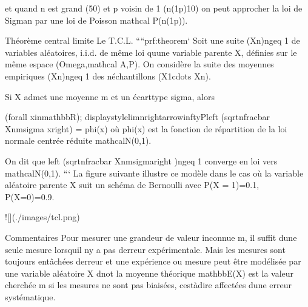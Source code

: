 \documentclass[letterpaper,10pt,french]{sphinxmanual}
\begin{document}
\begin{sphinxVerbatim}[commandchars=\\\{\}]
et quand \PYGZdl{}n\PYGZdl{} est grand (\PYGZgt{}50) et \PYGZdl{}p\PYGZdl{} voisin de 1 (\PYGZdl{}n(1\PYGZhy{}p)\PYGZlt{}10\PYGZdl{}) on peut approcher la loi de \PYGZdl{}\PYGZbs{}Sigma\PYGZus{}n\PYGZdl{} par une loi de Poisson \PYGZdl{}\PYGZbs{}mathcal P(n(1\PYGZhy{}p))\PYGZdl{}.


\PYGZsh{}\PYGZsh{} Théorème central limite
\PYGZsh{}\PYGZsh{}\PYGZsh{} Le T.C.L.
````\PYGZob{}prf:theorem\PYGZcb{}`
Soit une suite \PYGZdl{}(X\PYGZus{}n)\PYGZus{}\PYGZob{}n\PYGZbs{}geq 1\PYGZcb{}\PYGZdl{} de variables aléatoires, i.i.d. de même loi qu\PYGZsq{}une variable parente \PYGZdl{}X\PYGZdl{}, définies sur le même espace \PYGZdl{}(\PYGZbs{}Omega,\PYGZbs{}mathcal A,P)\PYGZdl{}. On considère la suite des moyennes empiriques \PYGZdl{}(X\PYGZus{}n)\PYGZus{}\PYGZob{}n\PYGZbs{}geq 1\PYGZcb{}\PYGZdl{} des \PYGZdl{}n\PYGZdl{}\PYGZhy{}échantillons \PYGZdl{}(X\PYGZus{}1\PYGZbs{}cdots X\PYGZus{}n)\PYGZdl{}.

Si \PYGZdl{}X\PYGZdl{} admet une moyenne \PYGZdl{}m\PYGZdl{} et un écart\PYGZhy{}type \PYGZdl{}\PYGZbs{}sigma\PYGZdl{}, alors 

\PYGZdl{}(\PYGZbs{}forall x\PYGZbs{}in\PYGZbs{}mathbb\PYGZob{}R\PYGZcb{})\PYGZbs{}; \PYGZbs{}displaystyle\PYGZbs{}lim\PYGZus{}\PYGZob{}n\PYGZbs{}rightarrow\PYGZbs{}infty\PYGZcb{}P\PYGZbs{}left (\PYGZbs{}sqrt\PYGZob{}n\PYGZcb{}\PYGZbs{}frac\PYGZob{}\PYGZbs{}bar X\PYGZus{}n\PYGZhy{}m\PYGZcb{}\PYGZob{}\PYGZbs{}sigma\PYGZcb{} \PYGZlt{}x\PYGZbs{}right) = \PYGZbs{}phi(x)\PYGZdl{}
où \PYGZdl{} \PYGZbs{}phi(x)\PYGZdl{} est la fonction de répartition de la loi normale centrée réduite \PYGZdl{}\PYGZbs{}mathcal\PYGZob{}N\PYGZcb{}(0,1)\PYGZdl{}.

On dit que \PYGZdl{}\PYGZbs{}left (\PYGZbs{}sqrt\PYGZob{}n\PYGZcb{}\PYGZbs{}frac\PYGZob{}\PYGZbs{}bar X\PYGZus{}n\PYGZhy{}m\PYGZcb{}\PYGZob{}\PYGZbs{}sigma\PYGZcb{}\PYGZbs{}right )\PYGZus{}\PYGZob{}n\PYGZbs{}geq 1\PYGZcb{}\PYGZdl{} converge en loi vers \PYGZdl{}\PYGZbs{}mathcal\PYGZob{}N\PYGZcb{}(0,1)\PYGZdl{}.
```
La figure suivante illustre ce modèle dans le cas où la variable aléatoire parente \PYGZdl{}X\PYGZdl{} suit un schéma de Bernoulli avec \PYGZdl{}P(X = 1)=0.1, P(X=0)=0.9\PYGZdl{}.

![](./images/tcl.png)


\PYGZsh{}\PYGZsh{}\PYGZsh{} Commentaires
Pour mesurer une grandeur de valeur inconnue \PYGZdl{}m\PYGZdl{}, il suffit d\PYGZsq{}une seule mesure lorsqu\PYGZsq{}il n\PYGZsq{}y a pas d\PYGZsq{}erreur expérimentale. Mais les mesures sont toujours entâchées d\PYGZsq{}erreur et une expérience ou mesure peut être modélisée par une variable aléatoire \PYGZdl{}X\PYGZdl{} dnot la moyenne théorique \PYGZdl{}\PYGZbs{}mathbb\PYGZob{}E\PYGZcb{}(X)\PYGZdl{} est la valeur cherchée \PYGZdl{}m\PYGZdl{} si les mesures ne sont pas biaisées, c\PYGZsq{}est\PYGZhy{}à\PYGZhy{}dire affectées d\PYGZsq{}une erreur systématique.


\end{sphinxVerbatim}
\end{document}
